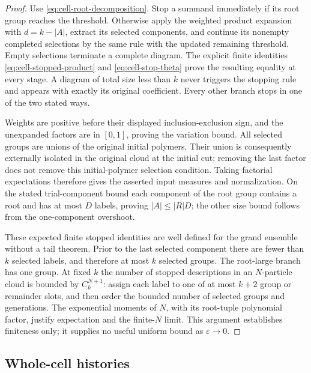 \begin{proof}
Use \eqref{eq:cell-root-decomposition}.  Stop a summand immediately
if its root group reaches the threshold.  Otherwise apply the
weighted product expansion with $d=k-|A|$, extract its selected
components, and continue its nonempty completed selections by the
same rule with the updated remaining threshold.  Empty selections
terminate a complete diagram.  The explicit finite identities
\eqref{eq:cell-stopped-product} and
\eqref{eq:cell-stop-theta} prove the resulting equality at every
stage.  A diagram of total size less than $k$ never triggers the
stopping rule and appears with exactly its original coefficient.
Every other branch stops in one of the two stated ways.

Weights are positive before their displayed inclusion-exclusion
sign, and the unexpanded factors are in $[0,1]$, proving the
variation bound.  All selected groups are unions of the original
initial polymers.  Their union is consequently externally isolated
in the original cloud at the initial cut; removing the last factor
does not remove this initial-polymer selection condition.  Taking
factorial expectations therefore gives the asserted input measures
and normalization.  On the stated trial-component bound each
component of the root group contains a root and has at most $D$
labels, proving $|A|\leq |R|D$; the other size bound follows from
the one-component overshoot.

These expected finite stopped identities are well defined for
the grand ensemble without a tail theorem.  Prior to the last
selected component there are fewer than $k$ selected labels, and
therefore at most $k$ selected groups.  The root-large branch has
one group.  At fixed $k$ the number of stopped descriptions in
an $N$-particle cloud is bounded by $C_k^{N+1}$: assign each label
to one of at most $k+2$ group or remainder slots, and then order
the bounded number of selected groups and generations.  The
exponential moments of $N$, with its root-tuple polynomial factor,
justify expectation and the finite-$N$ limit.  This argument
establishes finiteness only; it supplies no useful uniform bound
as $\varepsilon\to0$.
\end{proof}

\subsection{Whole-cell histories}


